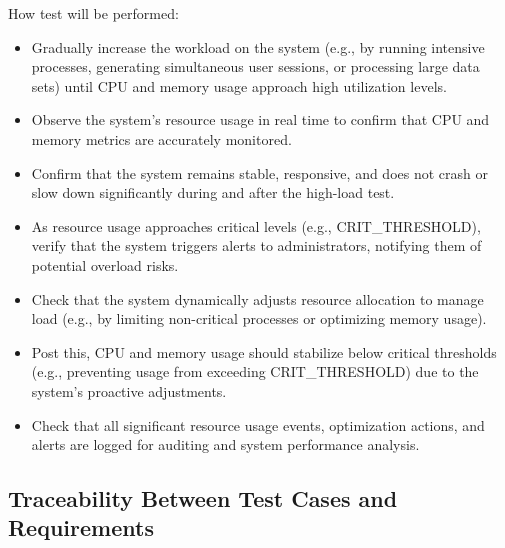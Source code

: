 \documentclass[12pt, titlepage]{article}
\begin{document}
\begin{enumerate}
  How test will be performed: 
  \begin{itemize}
    \item Gradually increase the workload on the system (e.g., by running
    intensive processes, generating simultaneous user sessions, or processing
    large data sets) until CPU and memory usage approach high utilization
    levels.
    \item  Observe the system's resource usage in real time to confirm that CPU
    and memory metrics are accurately monitored.
    \item Confirm that the system remains stable, responsive, and does not crash
    or slow down significantly during and after the high-load test.
    \item As resource usage approaches critical levels (e.g., CRIT\_THRESHOLD),
    verify that the system triggers alerts to administrators, notifying them of
    potential overload risks.
    \item Check that the system dynamically adjusts resource allocation to
    manage load (e.g., by limiting non-critical processes or optimizing memory
    usage).
    \item Post this, CPU and memory usage should stabilize below critical
    thresholds (e.g., preventing usage from exceeding CRIT\_THRESHOLD) due to
    the system's proactive adjustments.
    \item Check that all significant resource usage events, optimization
    actions, and alerts are logged for auditing and system performance analysis.
  \end{itemize}

\end{enumerate}

\subsection{Traceability Between Test Cases and Requirements}
\end{document}
